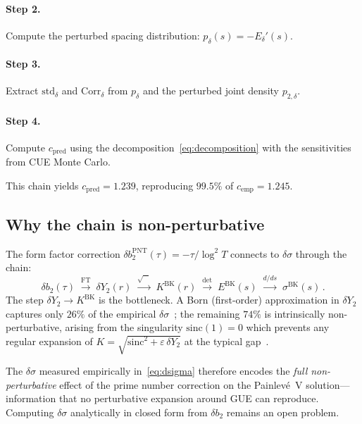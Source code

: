 \documentclass[11pt]{article}
\theoremstyle{plain}
\theoremstyle{remark}
\begin{document}
\paragraph{Step 2.}
Compute the perturbed spacing distribution:
$p_\delta(s) = -E_\delta'(s)$.

\paragraph{Step 3.}
Extract $\mathrm{std}_\delta$ and $\mathrm{Corr}_\delta$ from $p_\delta$
and the perturbed joint density $p_{2,\delta}$.

\paragraph{Step 4.}
Compute $c_{\mathrm{pred}}$ using the decomposition~\eqref{eq:decomposition}
with the sensitivities from CUE Monte Carlo.

This chain yields $c_{\mathrm{pred}} = 1.239$, reproducing $99.5\%$ of
$c_{\mathrm{emp}} = 1.245$.

\subsection{Why the chain is non-perturbative}

The form factor correction $\delta b_2^{\mathrm{PNT}}(\tau) = -\tau/\log^2 T$
connects to $\delta\sigma$ through the chain:
\begin{equation}
\delta b_2(\tau) \;\xrightarrow{\mathrm{FT}}\;
\delta Y_2(r) \;\xrightarrow{\sqrt{\;\cdot\;}}\;
K^{\mathrm{BK}}(r) \;\xrightarrow{\det}\;
E^{\mathrm{BK}}(s) \;\xrightarrow{d/ds}\;
\sigma^{\mathrm{BK}}(s)\,.
\label{eq:chain}
\end{equation}
The step $\delta Y_2 \to K^{\mathrm{BK}}$ is the bottleneck.
A Born (first-order) approximation in $\delta Y_2$ captures only $26\%$ of
the empirical $\delta\sigma$~\cite{alarcon2026b}; the remaining $74\%$ is
intrinsically non-perturbative, arising from the singularity
$\mathrm{sinc}(1) = 0$ which prevents any regular expansion of
$K = \sqrt{\mathrm{sinc}^2 + \varepsilon\,\delta Y_2}$ at the typical
gap~\cite{alarcon2026c}.

The $\delta\sigma$ measured empirically in~\eqref{eq:dsigma} therefore
encodes the \emph{full non-perturbative} effect of the prime number
correction on the Painlev\'e~V solution---information that no
perturbative expansion around GUE can reproduce. Computing $\delta\sigma$
analytically in closed form from $\delta b_2$ remains an open problem.
\end{document}
